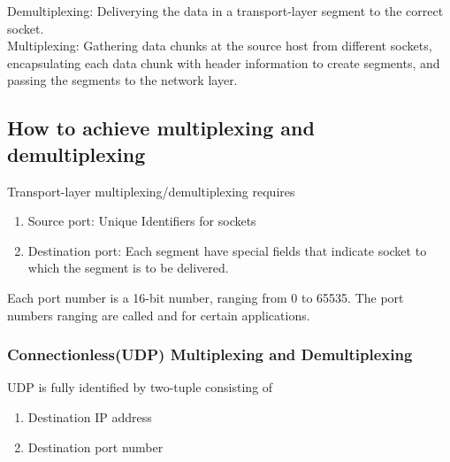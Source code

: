 \hf Demultiplexing: Deliverying the data in a transport-layer segment to the correct socket.\\

Multiplexing: Gathering data chunks at the source host from different sockets, encapsulating each
data chunk with header information to create segments, and passing the segments to the network layer.\\



\subsection{How to achieve multiplexing and demultiplexing}

\hf Transport-layer multiplexing/demultiplexing requires
\begin{enumerate}
    \item Source port: Unique Identifiers for sockets
    \item Destination port: Each segment have special fields that indicate socket to which the segment is to be delivered.
\end{enumerate}



Each port number is a 16-bit number, ranging from 0 to 65535. The port numbers ranging 
are called  and  for certain applications.\\
\newline


\subsubsection{Connectionless(UDP) Multiplexing and Demultiplexing}

\hf UDP is fully identified by two-tuple consisting	of 
\begin{enumerate}
	\item Destination IP address
	\item Destination port number
\end{enumerate}


